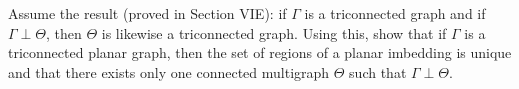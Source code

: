 Assume the result (proved in Section VIE): if $\Gamma$ is a triconnected graph and if $\Gamma \perp \Theta$, then $\Theta$ is likewise a triconnected graph. Using this, show that if $\Gamma$ is a triconnected planar graph, then the set of regions of a planar imbedding is unique and that there exists only one connected multigraph $\Theta$ such that $\Gamma \perp \Theta$.
